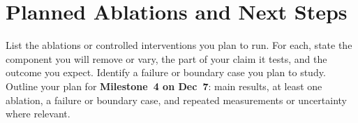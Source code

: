 \documentclass[conference,10pt,letterpaper]{IEEEtran}
\begin{document}
\section{Planned Ablations and Next Steps}
List the ablations or controlled interventions you plan to run. For each,
state the component you will remove or vary, the part of your claim it
tests, and the outcome you expect. Identify a failure or boundary case
you plan to study. Outline your plan for \textbf{Milestone~4 on Dec~7}:
main results, at least one ablation, a failure or boundary case, and
repeated measurements or uncertainty where relevant.

% 
% 
\end{document}
